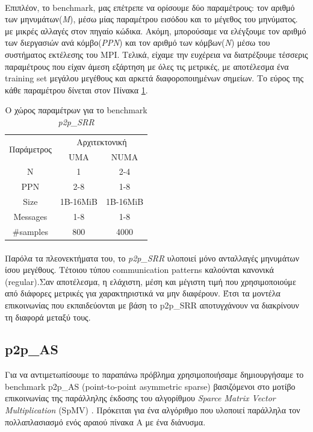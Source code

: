 \paragraph{}
Επιπλέον, το benchmark, μας επέτρεπε να ορίσουμε δύο παραμέτρους: τον αριθμό των μηνυμάτων(\textit{M}), μέσω μίας παραμέτρου εισόδου και το μέγεθος του μηνύματος. με μικρές αλλαγές στον πηγαίο κώδικα. Ακόμη, μπορούσαμε να ελέγξουμε τον αριθμό των διεργασιών ανά κόμβο(\textit{PPN}) και τον αριθμό των κόμβων(\textit{N}) μέσω του συστήματος εκτέλεσης του MPI. Τελικά, είχαμε την ευχέρεια να διατρέξουμε τέσσερις παραμέτρους που είχαν άμεση εξάρτηση με όλες τις μετρικές, με αποτέλεσμα ένα training set μεγάλου μεγέθους και αρκετά διαφοροποιημένων σημείων. Το εύρος της κάθε παραμέτρου δίνεται στον Πίνακα \ref{table:NBp2p}.

\begin{table}[h]
\centering
\footnotesize
\caption{Ο χώρος παραμέτρων για το benchmark \textit{p2p\_SRR}}
\label{table:NBp2p}
\begin{tabular}{c|cc}
\multirow{2}{*}{Παράμετρος} & \multicolumn{2}{c}{Αρχιτεκτονική} \\ 
                            & UMA             & NUMA            \\ \hline \hline
N                           & 1               & 2-4             \\
PPN                         & 2-8             & 1-8             \\
Size                        & 1B-16MiB        & 1B-16MiB        \\
Messages                    & 1-8             & 1-8             \\ \hline
\#samples                   & 800             & 4000           
\end{tabular}
\end{table}

\paragraph{}
Παρόλα τα πλεονεκτήματα του, το \textit{p2p\_SRR} υλοποιεί μόνο ανταλλαγές μηνυμάτων ίσου μεγέθους. Τέτοιου τύπου communication patterns καλούνται κανονικά (regular).Σαν αποτέλεσμα, η ελάχιστη, μέση και μέγιστη τιμή που χρησιμοποιούμε από διάφορες μετρικές για χαρακτηριστικά να μην διαφέρουν.  Έτσι τα μοντέλα επικοινωνίας που εκπαιδεύονται με βάση το p2p\_SRR αποτυγχάνουν να διακρίνουν τη διαφορά μεταξύ τους. 

\subsection{p2p\_AS}
Για να αντιμετωπίσουμε το παραπάνω πρόβλημα χρησιμοποιήσαμε δημιουργήσαμε το benchmark p2p\_AS (point-to-point asymmetric sparse)  βασιζόμενοι στο μοτίβο επικοινωνίας της παράλληλης έκδοσης του αλγορίθμου \textit{Sparce Matrix Vector Multiplication} (SpMV) \cite{CG}. Πρόκειται για ένα αλγόριθμο που υλοποιεί παράλληλα τον πολλαπλασιασμό ενός αραιού πίνακα Α με ένα διάνυσμα.


